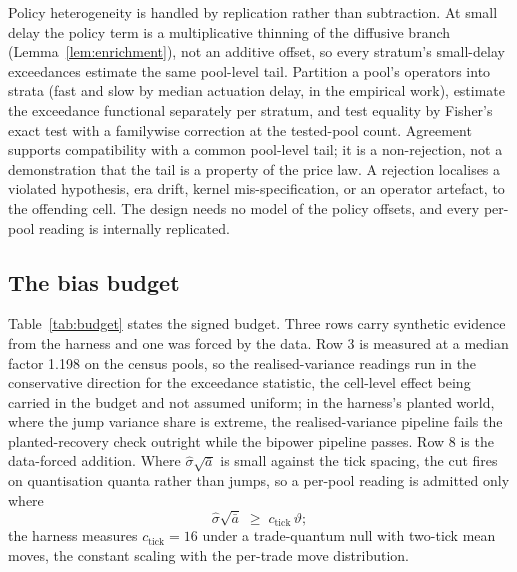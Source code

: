 \documentclass[11pt,a4paper]{article}
\theoremstyle{definition}
\theoremstyle{plain}
\theoremstyle{remark}
\begin{document}
Policy heterogeneity is handled by replication rather than subtraction. At small delay the policy term is a multiplicative thinning of the diffusive branch (Lemma~\ref{lem:enrichment}), 
not an additive offset, so every stratum's small-delay exceedances estimate the same pool-level tail. Partition a pool's operators into strata (fast and slow by median actuation delay, 
in the empirical work), estimate the exceedance functional separately per stratum, and test equality by Fisher's exact test with a familywise correction at the tested-pool count. 
Agreement supports compatibility with a common pool-level tail; it is a non-rejection, not a demonstration that the tail is a property of the price law. A rejection localises a violated 
hypothesis, era drift, kernel mis-specification, or an operator artefact, to the offending cell. The design needs no model of the policy offsets, and every per-pool reading is internally replicated.

\subsection{The bias budget}\label{sec:budget}

Table~\ref{tab:budget} states the signed budget. Three rows carry synthetic evidence from the harness and one was forced by the data. Row 3 is measured at a median factor 1.198 on the 
census pools, so the realised-variance readings run in the conservative direction for the exceedance statistic, the cell-level effect being carried in the budget and not assumed uniform; 
in the harness's planted world, where the jump variance share is extreme, the realised-variance pipeline fails the planted-recovery check outright while the bipower pipeline passes. Row 8 
is the data-forced addition. Where $\hat\sigma\sqrt{\bar a}$ is small against the tick spacing, the cut fires on quantisation quanta rather than jumps, so a per-pool reading is admitted only where
\begin{equation}\label{eq:admission}
\hat\sigma\sqrt{\bar a} \;\ge\; c_{\mathrm{tick}}\, \vartheta;
\end{equation}
the harness measures $c_{\mathrm{tick}} = 16$ under a trade-quantum null with two-tick mean moves, the constant scaling with the per-trade move distribution.
\end{document}
